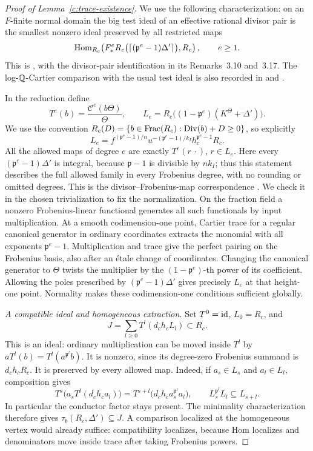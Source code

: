 \begin{proof}[Proof of Lemma~\ref{c:trace-existence}]
We use the following characterization: on an $F$-finite normal domain the
big test ideal of an effective rational divisor pair is the smallest
nonzero ideal preserved by all restricted maps
\[
 \operatorname{Hom}_{R_c}\!\left(
 F_*^eR_c\bigl(\lceil(\mathfrak p^e-1)\Delta'\rceil\bigr),R_c\right),
 \qquad e\ge1.
\]
This is \cite[Definitions~3.15--3.16 and Theorem~3.18]{SchwedeNonQG},
with the divisor-pair identification in its Remarks~3.10 and~3.17.
The log-$\mathbb Q$-Cartier comparison with the usual test ideal is also recorded
in \cite[Theorem~2.8(2)]{Takagi} and
\cite[Remark~6.1]{SchwedeNonQG}.

In the reduction define
\[
 T^e(b)=\frac{\mathcal C^e(b\Theta)}{\Theta},\qquad
 L_e=R_c\bigl((1-\mathfrak p^e)(K^\Theta+\Delta')\bigr).
\]
We use the convention
$R_c(D)=\{b\in\operatorname{Frac}(R_c):\operatorname{Div}(b)+D\ge0\}$, so explicitly
\[
 L_e=f^{(\mathfrak p^e-1)/n}u^{-(\mathfrak p^e-1)/k_I}h_c^{\mathfrak p^e-1}R_c.
\]
All the allowed maps of degree $e$ are exactly $T^e(r\,\cdot)$,
$r\in L_e$.  Here every $(\mathfrak p^e-1)\Delta'$ is integral, because
$\mathfrak p-1$ is divisible by $nk_I$; thus this statement describes the full
allowed family in every Frobenius degree, with no rounding or omitted
degrees.  This is the divisor--Frobenius-map correspondence
\cite[Corollary~3.10 and Theorems~3.11, 3.13]{SchwedeFAdjunction}.
We check it in the chosen trivialization to fix the normalization.
On the fraction field a nonzero
Frobenius-linear functional generates all such functionals by input
multiplication.  At a smooth codimension-one point, Cartier trace for a
regular canonical generator in ordinary coordinates extracts the monomial
with all exponents $\mathfrak p^e-1$.  Multiplication and trace give the perfect
pairing on the Frobenius basis, also after an \'etale change of coordinates.
Changing the canonical generator to $\Theta$ twists the multiplier by
the $(1-\mathfrak p^e)$-th power of its coefficient.  Allowing the poles prescribed
by $(\mathfrak p^e-1)\Delta'$ gives precisely $L_e$ at that height-one point.
Normality makes these codimension-one conditions sufficient globally.

\emph{A compatible ideal and homogeneous extraction.}
Set $T^0=\operatorname{id}$, $L_0=R_c$, and
\[
 J=\sum_{l\ge0}T^l(d_ch_cL_l)\subset R_c.
\]
This is an ideal: ordinary multiplication can be moved inside $T^l$ by
$aT^l(b)=T^l(a^{\mathfrak p^l}b)$.  It is nonzero, since its degree-zero Frobenius
summand is $d_ch_cR_c$.  It is preserved by every allowed map.  Indeed,
if $a_s\in L_s$ and $a_l\in L_l$, composition gives
\[
 T^s\bigl(a_sT^l(d_ch_ca_l)\bigr)
   =T^{s+l}\bigl(d_ch_ca_s^{\mathfrak p^l}a_l\bigr),\qquad
 L_s^{\mathfrak p^l}L_l\subseteq L_{s+l}.
\]
In particular the conductor factor stays present.  The minimality
characterization therefore gives $\tau_b(R_c,\Delta')\subseteq J$.
A comparison localized at the homogeneous vertex would already suffice:
compatibility localizes, because Hom localizes and denominators move
inside trace after taking Frobenius powers.


\end{proof}
